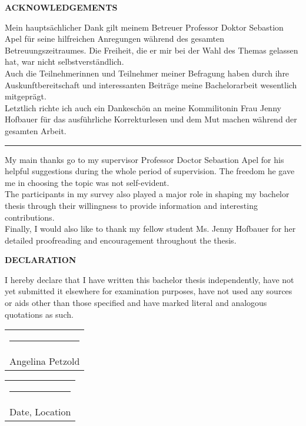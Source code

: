 {	
	\vspace{0.9cm}
	\large
	
	\textbf{\centering ACKNOWLEDGEMENTS}
	\vspace*{\fill}

	Mein hauptsächlicher Dank gilt meinem Betreuer Professor Doktor Sebastion Apel für seine hilfreichen Anregungen während des gesamten Betreuungszeitraumes. Die Freiheit, die er mir bei der Wahl des Themas gelassen hat, war nicht selbstverständlich.
	\newline \\
	Auch die Teilnehmerinnen und Teilnehmer meiner Befragung haben durch ihre Auskunftbereitschaft und interessanten Beiträge meine Bachelorarbeit wesentlich mitgeprägt.
	\newline \\
	Letztlich richte ich auch ein Dankeschön an meine Kommilitonin  Frau Jenny Hofbauer für das ausführliche Korrekturlesen und dem Mut machen während der gesamten Arbeit.
	
	\vspace{1cm}
	\noindent\hfil\rule{0.5\textwidth}{.4pt}\hfil
	\vspace{1cm}
	
	My main thanks go to my supervisor Professor Doctor Sebastion Apel for his helpful suggestions during the whole period of supervision. The freedom he gave me in choosing the topic was not self-evident.
	\newline \\
	The participants in my survey also played a major role in shaping my bachelor thesis through their willingness to provide information and interesting contributions.
	\newline \\
	Finally, I would also like to thank my fellow student Ms. Jenny Hofbauer for her detailed proofreading and encouragement throughout the thesis.
	\vspace*{\fill}
	\pagebreak

	\large
	\leavevmode%
	\vspace*{\fill}
	\begin{center}
		\textbf{DECLARATION}
	\end{center}
			I hereby declare that I have written this bachelor thesis independently, have not yet submitted it elsewhere for examination purposes, have not used any sources or aids other than those specified and have marked literal and analogous quotations as such.
	
	\vspace*{4em}\noindent
	\hfill%
	\begin{tabular}[t]{c}
		\rule{10em}{0.4pt}\\ Angelina Petzold
	\end{tabular}%
	\hfill%
	\begin{tabular}[t]{c}
		\rule{10em}{0.4pt}\\ Date, Location
	\end{tabular}%
	\hfill\strut
	\vspace*{\fill}

	\pagebreak

\par}